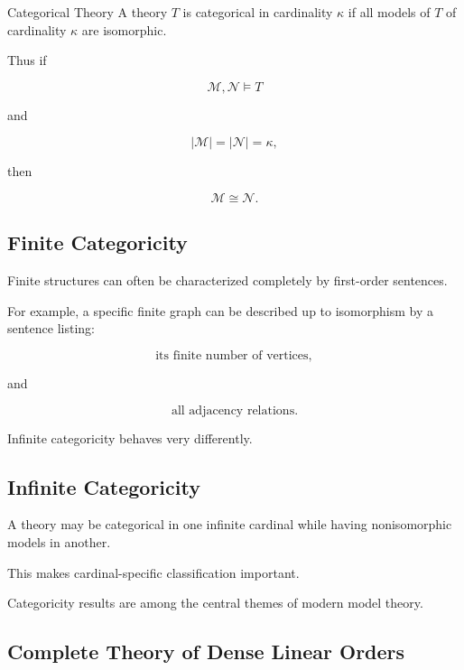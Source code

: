 \begin{definitionbox}{Categorical Theory}
A theory \(T\) is categorical in cardinality \(\kappa\) if all models of
\(T\) of cardinality \(\kappa\) are isomorphic.
\end{definitionbox}

Thus if

\[
\mathcal{M},
\mathcal{N}\models T
\]

and

\[
|\mathcal{M}|
=
|\mathcal{N}|
=
\kappa,
\]

then

\[
\boxed{
\mathcal{M}
\cong
\mathcal{N}.
}
\]

\subsection{Finite Categoricity}
\label{subsec:finite-categoricity}

Finite structures can often be characterized completely by first-order
sentences.

For example, a specific finite graph can be described up to isomorphism by
a sentence listing:

\[
\boxed{
\text{its finite number of vertices},
}
\]

and

\[
\boxed{
\text{all adjacency relations}.
}
\]

Infinite categoricity behaves very differently.

\subsection{Infinite Categoricity}
\label{subsec:infinite-categoricity}

A theory may be categorical in one infinite cardinal while having
nonisomorphic models in another.

This makes cardinal-specific classification important.

Categoricity results are among the central themes of modern model theory.

\subsection{Complete Theory of Dense Linear Orders}
\label{subsec:dense-linear-orders}

